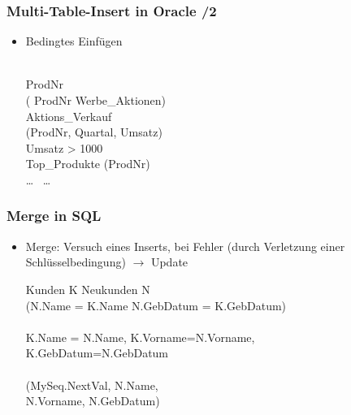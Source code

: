     
    \begin{frame}
    
    \frametitle{Multi-Table-Insert in Oracle /2}
    
    \begin{itemize}
    \item Bedingtes Einfügen
    
    \hspace*{-1cm}\begin{sql}
     \\
     ProdNr  \\
    \1 ( ProdNr  Werbe\_Aktionen) \\
     Aktions\_Verkauf \\
    \1  (ProdNr, Quartal, Umsatz) \\
     Umsatz > 1000 \\
    \1  Top\_Produkte  (ProdNr) \\
     \dots\  \dots
    \end{sql}
    
    \end{itemize}
    
    \end{frame}
    
    
    \begin{frame}
    
    \frametitle{Merge in SQL}
    
    \begin{itemize}
    \item Merge: Versuch eines Inserts, bei Fehler (durch Verletzung einer
      Schlüsselbedingung) $\rightarrow$ Update
    \hspace*{-1cm}\begin{sql}
     Kunden K  Neukunden N \\
     (N.Name = K.Name  N.GebDatum = K.GebDatum) \\
     \\
     K.Name = N.Name, K.Vorname=N.Vorname, \\
    \1 K.GebDatum=N.GebDatum \\
     \\
     (MySeq.NextVal, N.Name, \\
    \1 N.Vorname, N.GebDatum)
    \end{sql}
    
    \end{itemize}
    
    \end{frame}

